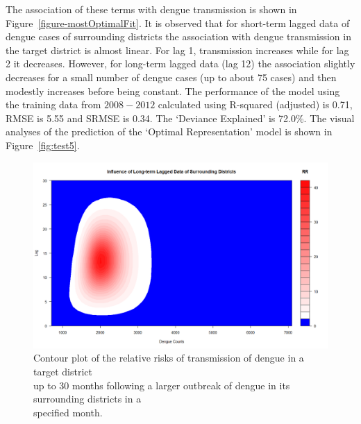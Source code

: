 \documentclass{bmcart}
\begin{document}
The association of these terms with dengue transmission is shown in Figure~\ref{figure-mostOptimalFit}. It is observed that for short-term lagged data of dengue cases of surrounding districts the association with dengue transmission in the target district is almost linear. For lag 1, transmission increases while for lag 2 it decreases. However, for long-term lagged data (lag 12) the association slightly decreases for a small number of dengue cases (up to about 75 cases) and then modestly increases before being constant. The performance of the model using the training data from $2008-2012$ calculated using R-squared (adjusted) is 0.71, RMSE is 5.55 and SRMSE is 0.34. The `Deviance Explained' is 72.0\%. The visual analyses of the prediction of the `Optimal Representation' model is shown in Figure~\ref{fig:test5}. 


\begin{figure}[htbp]
	\begin{center}
		\includegraphics[width= 1.0\textwidth]{10-Contour-SurroundingLongLag}
		\caption{Contour plot of the relative risks of transmission of dengue in a target district \\ up to 30 months following a larger outbreak of dengue in its surrounding districts in a \\ specified month.}
		\label{fig:surroundingDistrictContour}
	\end{center}
\end{figure}
\end{document}
